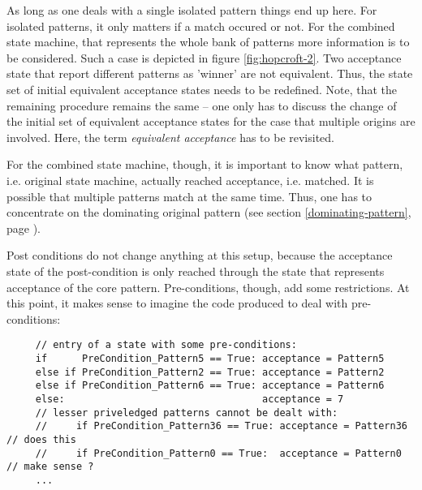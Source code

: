 As long as one deals with a single isolated pattern things end up here.  For
isolated patterns, it only matters if a match occured or not. For the combined
state machine, that represents the whole bank of patterns more information is
to be considered. Such a case is depicted in figure \ref{fig:hopcroft-2}. Two
acceptance state that report different patterns as 'winner' are not equivalent.
Thus, the state set of initial equivalent acceptance states needs to be redefined.
Note, that the remaining procedure remains the same -- one only has to discuss
the change of the initial set of equivalent acceptance states for the case that
multiple origins are involved.  Here, the term {\it equivalent acceptance} has
to be revisited. 


For the combined state machine, though, it is important to know what pattern,
    i.e. original state machine, actually reached acceptance, i.e. matched.  It
    is possible that multiple patterns match at the same time. Thus, one has to
    concentrate on the dominating original pattern (see section
	    \ref{dominating-pattern}, page \pageref{dominating-pattern}).


Post conditions do not change anything at this setup, because the acceptance 
state of the post-condition is only reached through the state that represents
acceptance of the core pattern. Pre-conditions, though, add some restrictions.
At this point, it makes sense to imagine the code produced to deal with pre-
conditions:

\begin{lstlisting}
     // entry of a state with some pre-conditions:
     if      PreCondition_Pattern5 == True: acceptance = Pattern5
     else if PreCondition_Pattern2 == True: acceptance = Pattern2
     else if PreCondition_Pattern6 == True: acceptance = Pattern6
     else:                                  acceptance = 7
     // lesser priveledged patterns cannot be dealt with:
     //     if PreCondition_Pattern36 == True: acceptance = Pattern36   // does this 
     //     if PreCondition_Pattern0 == True:  acceptance = Pattern0    // make sense ?
     ...
\end{lstlisting}

